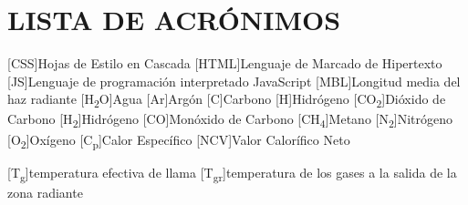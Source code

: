 \chapter*{LISTA DE ACRÓNIMOS}

\begin{acronym}

[CSS]{Hojas de Estilo en Cascada}
[HTML]{Lenguaje de Marcado de Hipertexto}
[JS]{Lenguaje de programación interpretado JavaScript}
[MBL]{Longitud media del haz radiante}
[H\textsubscript{2}O]{Agua}
[Ar]{Argón}
[C]{Carbono}
[H]{Hidrógeno}
[CO\textsubscript{2}]{Dióxido de Carbono}
[H\textsubscript{2}]{Hidrógeno}
[CO]{Monóxido de Carbono}
[CH\textsubscript{4}]{Metano}
[N\textsubscript{2}]{Nitrógeno}
[O\textsubscript{2}]{Oxígeno}
[C\textsubscript{p}]{Calor Específico}
[NCV]{Valor Calorífico Neto}

[T\textsubscript{g}]{temperatura efectiva de llama}
[T\textsubscript{gr}]{temperatura de los gases a la salida de la zona radiante}


\end{acronym}
\clearpage